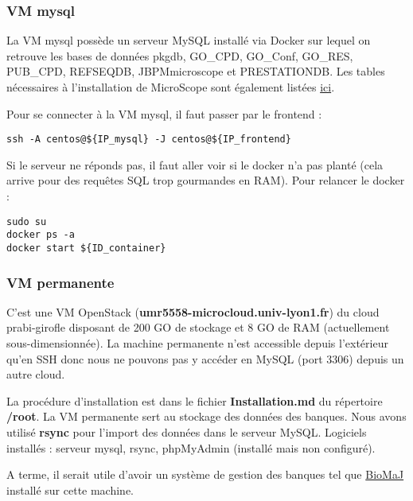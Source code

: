 \subsubsection {VM mysql}

La VM mysql possède un serveur MySQL installé via Docker sur lequel on retrouve les bases de données pkgdb, GO\_CPD, GO\_Conf, GO\_RES, PUB\_CPD, REFSEQDB, JBPMmicroscope et PRESTATIONDB.
\newline
Les tables nécessaires à l'installation de MicroScope sont également listées \href{https://intranet.genoscope.cns.fr/agc/redmine/projects/microcloud/wiki/Tables_necessaires_a_installation}{ici}.
\newline

Pour se connecter à la VM mysql, il faut passer par le frontend :
\begin{lstlisting}[style=bash]
ssh -A centos@${IP_mysql} -J centos@${IP_frontend}
\end{lstlisting}
\bigskip

Si le serveur ne réponds pas, il faut aller voir si le docker n'a pas planté (cela arrive pour des requêtes SQL trop gourmandes en RAM). Pour relancer le docker :
\begin{lstlisting}[style=bash]
sudo su
docker ps -a
docker start ${ID_container}
\end{lstlisting}

\subsubsection {VM permanente}

C'est une VM OpenStack (\textbf{umr5558-microcloud.univ-lyon1.fr}) \label{VM permanente} du cloud prabi-girofle disposant de 200 GO de stockage et 8 GO de RAM (actuellement sous-dimensionnée).
La machine permanente n'est accessible depuis l'extérieur qu'en SSH donc nous ne pouvons pas y accéder en MySQL (port 3306) depuis un autre cloud.
\newline

La procédure d'installation est dans le fichier \textbf{Installation.md} du répertoire \textbf{/root}. La VM permanente sert au stockage des données des banques. Nous avons utilisé \textbf{rsync} pour l'import des données dans le serveur MySQL.
\newline
Logiciels installés : serveur mysql, rsync, phpMyAdmin (installé mais non configuré). 
\newline

A terme, il serait utile d'avoir un système de gestion des banques tel que \href{https://biomaj.genouest.org/}{BioMaJ} installé sur cette machine.\\

